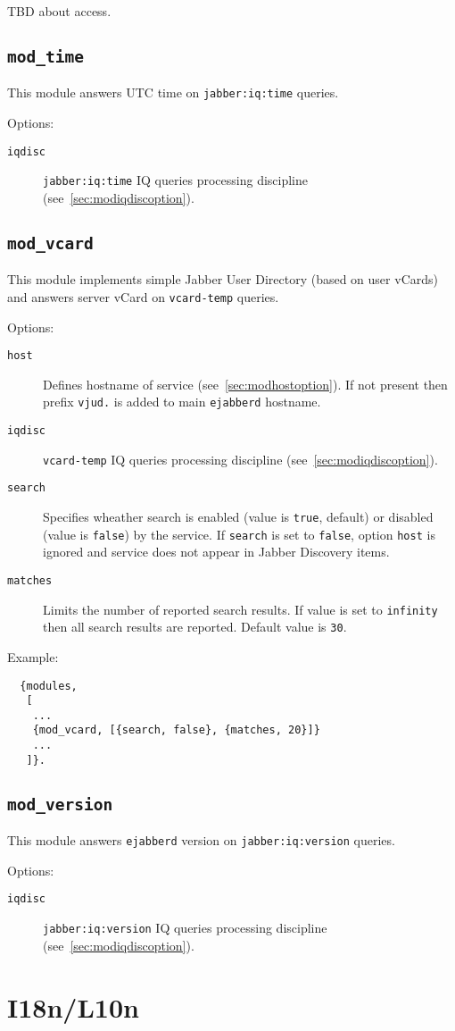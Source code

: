 \documentclass[a4paper,10pt]{article}
\newcommand{\bracehack}{\def\{{\char"7B}\def\}{\char"7D}}
\newcommand{\ns}[1]{\texttt{#1}}
\newcommand{\jid}[1]{\texttt{#1}}
\newcommand{\term}[1]{\texttt{#1}}
\newcommand{\ejabberd}{\texttt{ejabberd}}
\newcommand{\module}[1]{\texttt{#1}}
\newcommand{\modtime}{\module{mod\_time}}
\newcommand{\modvcard}{\module{mod\_vcard}}
\newcommand{\modversion}{\module{mod\_version}}
\newcommand{\titem}[1]{\item[\bracehack\texttt{#1}]}
\newcommand{\iqdiscitem}[1]{\titem{iqdisc} #1 IQ queries processing
discipline (see~\ref{sec:modiqdiscoption}).}
\newcommand{\hostitem}[1]{\titem{host} Defines hostname of service
(see~\ref{sec:modhostoption}). If not present
then prefix \jid{#1.} is added to main \ejabberd{} hostname.}
\begin{document}
TBD about access.


\subsection{\modtime{}}
\label{sec:modtime}

This module answers UTC time on \ns{jabber:iq:time} queries.

Options:
\begin{description}
\iqdiscitem{\ns{jabber:iq:time}}
\end{description}


\subsection{\modvcard{}}
\label{sec:modvcard}

This module implements simple Jabber User Directory (based on user vCards)
and answers server vCard on \ns{vcard-temp} queries.

Options:
\begin{description}
\hostitem{vjud}
\iqdiscitem{\ns{vcard-temp}}
\titem{search} Specifies wheather search is enabled (value is \term{true}, default) or
disabled (value is \term{false}) by the service. If \term{search} is set to \term{false},
option \term{host} is ignored and service does not appear in Jabber Discovery items.
\titem{matches} Limits the number of reported search results. If value is set to
\term{infinity} then all search results are reported. Default value is \term{30}.
\end{description}

Example:
\begin{verbatim}
  {modules,
   [
    ...
    {mod_vcard, [{search, false}, {matches, 20}]}
    ...
   ]}.
\end{verbatim}


\subsection{\modversion{}}
\label{sec:modversion}

This module answers \ejabberd{} version on \ns{jabber:iq:version} queries.

Options:
\begin{description}
\iqdiscitem{\ns{jabber:iq:version}}
\end{description}


\section{I18n/L10n}
\label{sec:i18nl10n}
\end{document}
